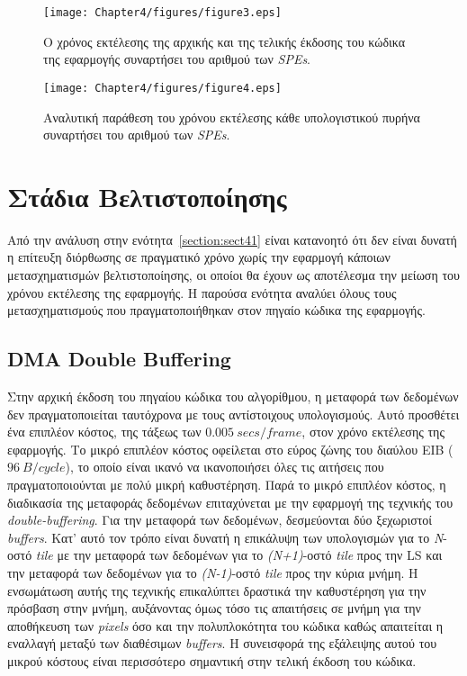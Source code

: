 \begin{figure}
\centering
\texttt{[image: Chapter4/figures/figure3.eps]}
\caption{Ο χρόνος εκτέλεσης της αρχικής και της τελικής έκδοσης του κώδικα της εφαρμογής συναρτήσει του αριθμού των \textsl{SPEs}.}
\label{figure:fig43}
\end{figure}
\begin{figure}
\centering
\texttt{[image: Chapter4/figures/figure4.eps]}
\caption{Αναλυτική παράθεση του χρόνου εκτέλεσης κάθε υπολογιστικού πυρήνα συναρτήσει του αριθμού των \textsl{SPEs}.}
\label{figure:fig44}
\end{figure}
\indent

\section{Στάδια Βελτιστοποίησης}
\label{section:sect42}
\indent
Από την ανάλυση στην ενότητα~\ref{section:sect41} είναι κατανοητό ότι δεν είναι δυνατή η επίτευξη διόρθωσης σε πραγματικό χρόνο χωρίς την εφαρμογή κάποιων μετασχηματισμών βελτιστοποίησης, οι οποίοι θα έχουν ως αποτέλεσμα την μείωση του χρόνου εκτέλεσης της εφαρμογής. Η παρούσα ενότητα αναλύει όλους τους μετασχηματισμούς που πραγματοποιήθηκαν στον πηγαίο κώδικα της εφαρμογής.

\subsection[4.2.1 DMA Double Buffering]{DMA Double Buffering}
\label{subsection:sub421}
\indent
Στην αρχική έκδοση του πηγαίου κώδικα του αλγορίθμου, η μεταφορά των δεδομένων δεν πραγματοποιείται ταυτόχρονα με τους αντίστοιχους υπολογισμούς. Αυτό προσθέτει ένα επιπλέον κόστος, της τάξεως των \(0.005\ secs/frame\), στον χρόνο εκτέλεσης της εφαρμογής. Το μικρό επιπλέον κόστος οφείλεται στο εύρος ζώνης του διαύλου \ac{EIB} (\(96\ B/cycle\)), το οποίο είναι ικανό να ικανοποιήσει όλες τις αιτήσεις που πραγματοποιούνται με πολύ μικρή καθυστέρηση.\newline \indent
Παρά το μικρό επιπλέον κόστος, η διαδικασία της μεταφοράς δεδομένων επιταχύνεται με την εφαρμογή της τεχνικής του \textsl{double-buffering}. Για την μεταφορά των δεδομένων, δεσμεύονται δύο ξεχωριστοί \textsl{buffers}. Κατ' αυτό τον τρόπο είναι δυνατή η επικάλυψη των υπολογισμών για το \textsl{Ν}-οστό \textsl{tile} με την μεταφορά των δεδομένων για το \textsl{(Ν+1)}-οστό \textsl{tile} προς την \ac{LS} και την μεταφορά των δεδομένων για το \textsl{(Ν-1)}-οστό \textsl{tile} προς την κύρια μνήμη. Η ενσωμάτωση αυτής της τεχνικής επικαλύπτει δραστικά την καθυστέρηση για την πρόσβαση στην μνήμη, αυξάνοντας όμως τόσο τις απαιτήσεις σε μνήμη για την αποθήκευση των \textsl{pixels} όσο και την πολυπλοκότητα του κώδικα καθώς απαιτείται η εναλλαγή μεταξύ των διαθέσιμων \textsl{buffers}. Η συνεισφορά της εξάλειψης αυτού του μικρού κόστους είναι περισσότερο σημαντική στην τελική έκδοση του κώδικα.

